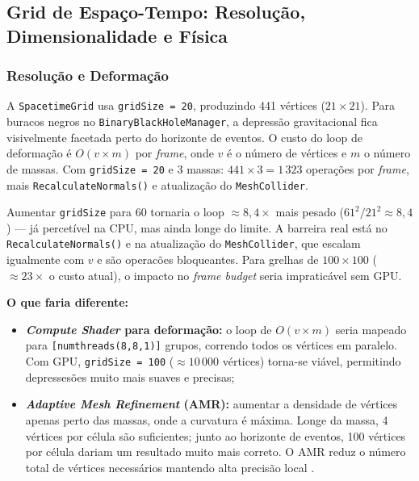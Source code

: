\documentclass[12pt,a4paper]{article}
\begin{document}
\subsection{Grid de Espa\c{c}o-Tempo: Resolu\c{c}\~{a}o, Dimensionalidade e F\'{i}sica}

\subsubsection{Resolu\c{c}\~{a}o e Deforma\c{c}\~{a}o}

A \texttt{SpacetimeGrid} usa \texttt{gridSize = 20}, produzindo 441 v\'{e}rtices ($21 \times 21$). Para buracos negros no \texttt{BinaryBlackHoleManager}, a depress\~{a}o gravitacional fica visivelmente facetada perto do horizonte de eventos. O custo do loop de deforma\c{c}\~{a}o \'{e} $O(v \times m)$ por \textit{frame}, onde $v$ \'{e} o n\'{u}mero de v\'{e}rtices e $m$ o n\'{u}mero de massas. Com \texttt{gridSize = 20} e 3 massas: $441 \times 3 = 1\,323$ opera\c{c}\~{o}es por \textit{frame}, mais \texttt{RecalculateNormals()} e atualiza\c{c}\~{a}o do \texttt{MeshCollider}.

Aumentar \texttt{gridSize} para 60 tornaria o loop $\approx 8{,}4\times$ mais pesado ($61^2/21^2 \approx 8{,}4$) --- j\'{a} percet\'{i}vel na CPU, mas ainda longe do limite. A barreira real est\'{a} no \texttt{RecalculateNormals()} e na atualiza\c{c}\~{a}o do \texttt{MeshCollider}, que escalam igualmente com $v$ e s\~{a}o operac\~{o}es bloqueantes. Para grelhas de $100 \times 100$ ($\approx 23\times$ o custo atual), o impacto no \textit{frame budget} seria impratic\'{a}vel sem GPU.

\textbf{O que faria diferente:}

\begin{itemize}
  \item \textbf{\textit{Compute Shader} para deforma\c{c}\~{a}o:} o loop de $O(v \times m)$ seria mapeado para \texttt{[numthreads(8,8,1)]} grupos, correndo todos os v\'{e}rtices em paralelo. Com GPU, \texttt{gridSize = 100} ($\approx 10\,000$ v\'{e}rtices) torna-se vi\'{a}vel, permitindo depresses\~{o}es muito mais suaves e precisas;
  
  \item \textbf{\textit{Adaptive Mesh Refinement} (AMR):} aumentar a densidade de v\'{e}rtices apenas perto das massas, onde a curvatura \'{e} m\'{a}xima. Longe da massa, 4 v\'{e}rtices por c\'{e}lula s\~{a}o suficientes; junto ao horizonte de eventos, 100 v\'{e}rtices por c\'{e}lula dariam um resultado muito mais correto. O AMR reduz o n\'{u}mero total de v\'{e}rtices necess\'{a}rios mantendo alta precis\~{a}o local \cite{berger1989}.
\end{itemize}
\end{document}

